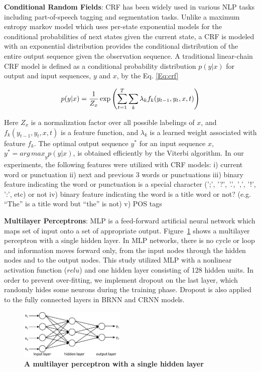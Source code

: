 \documentclass{amia}
\begin{document}
\textbf{Conditional Random Fields}: CRF has been widely used in various NLP tasks including part-of-speech tagging and segmentation tasks.\cite{lafferty2001conditional, hirohata2008identifying} Unlike a maximum entropy markov model which uses per-state exponential models for the conditional probabilities of next states given the current state, a CRF is modeled with an exponential distribution provides the conditional distribution of the entire output sequence given the observation sequence. A traditional linear-chain CRF model is defined as a conditional probability distribution $p(y|x)$ for output and input sequences, $y$ and $x$, by the Eq. \ref{Eq:crf}

\begin{equation}
\label{Eq:crf}
p(y|x) = \frac{1}{Z_x}\exp{\left(\sum_{t=1}^{T}\sum_{k}^{}\lambda_k f_k(y_{t-1}, y_t, x, t)\right)} \\
\end{equation}

Here $Z_x$ is a normalization factor over all possible labelings of $x$, and $f_k(y_{t-1}, y_t, x, t)$ is a feature function, and $\lambda_k$ is a learned weight associated with feature $f_k$. The optimal output sequence $y^*$ for an input sequence $x$, $y^* = {arg\,max}_y p(y|x)$, is obtained efficiently by the Viterbi algorithm. In our experiments, the following features were utilized with CRF models: i) current word or punctuation ii) next and previous 3 words or punctuations iii) binary feature indicating the word or punctuation is a special character (';', '?', '.', ',', '!', ':', etc) or not iv) binary feature indicating the word is a title word or not? (e.g. ``The'' is a title word but ``the'' is not) v) POS tags   

\textbf{Multilayer Perceptrons}: MLP is a feed-forward artificial neural network which maps set of input onto a set of appropriate output.\cite{rumelhart1986learning} Figure~\ref{fig:mlp} shows a multilayer perceptron with a single hidden layer. In MLP networks, there is no cycle or loop and information moves forward only, from the input nodes through the hidden nodes and to the output nodes. This study utilized MLP with a nonlinear activation function ($relu$) and one hidden layer consisting of 128 hidden units. In order to prevent over-fitting, we implement dropout on the last layer, which randomly hides some neurons during the training phase. \cite{srivastava2014dropout} Dropout is also applied to the fully connected layers in BRNN and CRNN models. 

\begin{figure}[!htb]
    \centering
    \includegraphics[width=0.45\textwidth]{figures/mlp.eps}
    \caption{\textbf{A multilayer perceptron with a single hidden layer}}
    \label{fig:mlp}
\end{figure}
\end{document}
